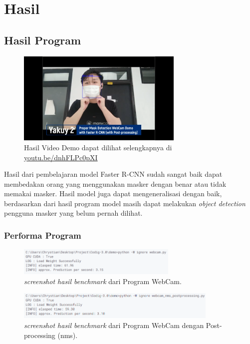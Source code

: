 \documentclass{article}
\begin{document}
  \newpage
  \section{Hasil}
  
  \subsection{Hasil Program}
  \begin{figure}[H]
	\centering
	\includegraphics[width=300px]{./images/implementasi/thumbnail.png}
	\caption{Hasil Video Demo dapat dilihat selengkapnya di \href{https://youtu.be/dnhFLPc0pXI}{youtu.be/dnhFLPc0pXI}}
  \end{figure}
  \par Hasil dari pembelajaran model Faster R-CNN sudah sangat baik dapat membedakan orang yang menggunakan masker dengan benar atau tidak memakai masker. Hasil model juga dapat mengeneralisasi dengan baik, berdasarkan dari hasil program model masih dapat melakukan \textit{object detection} pengguna masker yang belum pernah dilihat. 
  \subsubsection{Performa Program}

  
  
  \begin{figure}[H]
	\centering
	\includegraphics[height=50px]{benchmark/hasil1.png}
	\caption{\textit{screenshot hasil benchmark} dari Program WebCam.}
  \end{figure}

  \begin{figure}[H]
	\centering
	\includegraphics[height=50px]{benchmark/hasil2.png}
	\caption{\textit{screenshot hasil benchmark} dari Program WebCam dengan Post-processing (nms).}
  \end{figure}
\end{document}
